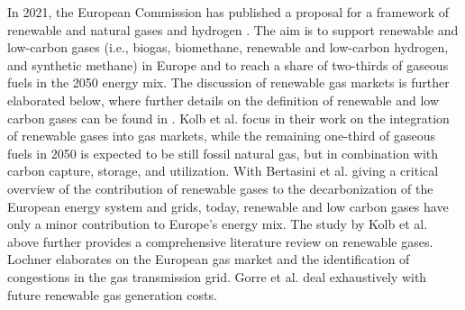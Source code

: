 In 2021, the European Commission has published a proposal for a framework of renewable and natural gases and hydrogen \cite{regulation_renewable_gases}. The aim is to support renewable and low-carbon gases (i.e., biogas, biomethane, renewable and low-carbon hydrogen, and synthetic methane) in Europe and to reach a share of two-thirds of gaseous fuels in the 2050 energy mix. The discussion of renewable gas markets is further elaborated below, where further details on the definition of renewable and low carbon gases can be found in \cite{briefing_renewable_gases}. Kolb et al. \cite{kolb2021scenarios} focus in their work on the integration of renewable gases into gas markets, while the remaining one-third of gaseous fuels in 2050 is expected to be still fossil natural gas, but in combination with carbon capture, storage, and utilization. With Bertasini et al. \cite{bertasini2023decarbonization} giving a critical overview of the contribution of renewable gases to the decarbonization of the European energy system and grids, today, renewable and low carbon gases have only a minor contribution to Europe's energy mix. The study by Kolb et al. \cite{kolb2021scenarios} above further provides a comprehensive literature review on renewable gases. Lochner \cite{lochner2011identification} elaborates on the European gas market and the identification of congestions in the gas transmission grid. Gorre et al. \cite{gorre2019production} deal exhaustively with future renewable gas generation costs.\vspace{0.3cm}

